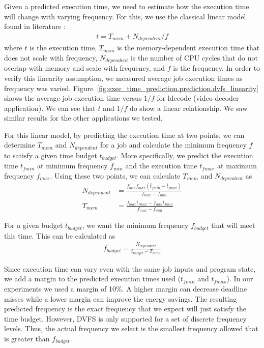 Given a predicted execution time, we need to estimate how the execution time
will change with varying frequency. For this, we use the classical linear model
found in literature \cite{xie-pldi03, wu-micro05}:
\begin{align*}
  t = T_{mem} + N_{dependent}/f
\end{align*}
where $t$ is the execution time, $T_{mem}$ is the memory-dependent execution
time that does not scale with frequency, $N_{dependent}$ is the number of CPU
cycles that do not overlap with memory and scale with frequency, and $f$ is the
frequency.  In order to verify this linearity assumption, we measured average
job execution times as frequency was varied.
Figure~\ref{fig:exec_time_prediction.prediction.dvfs_linearity} shows the
average job execution time versus $1/f$ for ldecode (video decoder
application). We can see that $t$ and $1/f$ do show a linear relationship. We
saw similar results for the other applications we tested.

For this linear model, by predicting the execution time at two points, we can
determine $T_{mem}$ and $N_{dependent}$ for a job and calculate the minimum
frequency $f$ to satisfy a given time budget $t_{budget}$. More specifically,
we predict the execution time $\bar{t}_{fmin}$ at minimum frequency $f_{min}$
and the execution time $\bar{t}_{fmax}$ at maximum frequency $f_{max}$. Using
these two points, we can calculate $T_{mem}$ and $N_{dependent}$ as
\begin{align*}
  N_{dependent} &= \frac{f_{min}f_{max}(\bar{t}_{fmin} - \bar{t}_{fmax})}{f_{max} - f_{min}} \\
  T_{mem} &= \frac{f_{max}\bar{t}_{fmax} - f_{min}\bar{t}_{fmin}}{f_{max} - f_{min}}
\end{align*}

For a given budget $t_{budget}$, we want the minimum frequency $f_{budget}$
that will meet this time. This can be calculated as
\begin{align*}
  f_{budget} = \frac{N_{dependent}}{t_{budget} - T_{mem}}
\end{align*}

Since execution time can vary even with the same job inputs and program state,
we add a margin to the predicted execution times used ($t_{fmin}$ and
$t_{fmax}$). In our experiments we used a margin of 10\%. A higher margin can
decrease deadline misses while a lower margin can improve the energy savings.
The resulting predicted frequency is the exact frequency that we expect will
just satisfy the time budget. However, DVFS is only supported for a set of
discrete frequency levels. Thus, the actual frequency we select is the smallest
frequency allowed that is greater than $f_{budget}$. 

